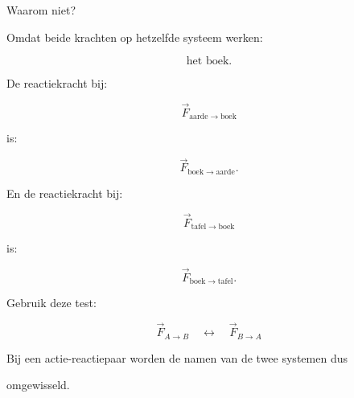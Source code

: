 \documentclass{ximera}
\begin{document}
Waarom niet?

Omdat beide krachten op hetzelfde systeem werken:

\[\boxed{\text{het boek}.}\]


De reactiekracht bij:

\[\vec F_{\mathrm{aarde}\rightarrow\mathrm{boek}}\]

is:

\[\vec F_{\mathrm{boek}\rightarrow\mathrm{aarde}}.\]

En de reactiekracht bij:

\[\vec F_{\mathrm{tafel}\rightarrow\mathrm{boek}}\]

is:

\[\vec F_{\mathrm{boek}\rightarrow\mathrm{tafel}}.\]


\begin{opmerking}

Gebruik deze test:

\[\boxed{ \vec F_{A\rightarrow B} \quad\leftrightarrow\quad \vec F_{B\rightarrow A} }\]

Bij een actie-reactiepaar worden de namen van de twee systemen dus

omgewisseld.

\end{opmerking}
\end{document}

